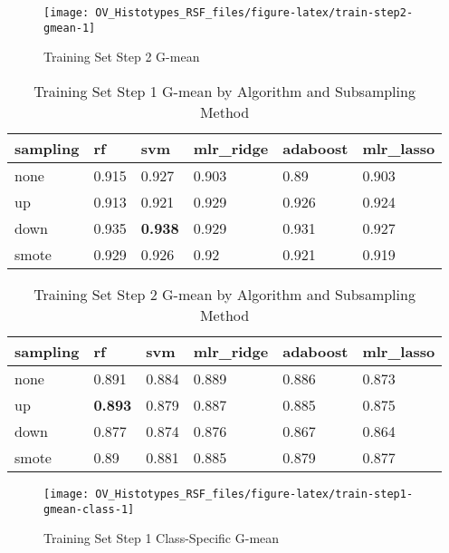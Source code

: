 \documentclass[
]{report}
\begin{document}
\begin{figure}[H]

{\centering \texttt{[image: OV\_Histotypes\_RSF\_files/figure-latex/train-step2-gmean-1]} 

}

\caption{Training Set Step 2 G-mean}\label{fig:train-step2-gmean}
\end{figure}

\begin{table}

\caption{\label{tab:train-step1-gmean-table}Training Set Step 1 G-mean by Algorithm and Subsampling Method}
\centering
\begin{tabular}[t]{l|l|l|l|l|l}
\hline
sampling & rf & svm & mlr\_ridge & adaboost & mlr\_lasso\\
\hline
none & 0.915 & 0.927 & 0.903 & 0.89 & 0.903\\
\hline
up & 0.913 & 0.921 & 0.929 & 0.926 & 0.924\\
\hline
down & 0.935 & \textbf{0.938} & 0.929 & 0.931 & 0.927\\
\hline
smote & 0.929 & 0.926 & 0.92 & 0.921 & 0.919\\
\hline
\end{tabular}
\end{table}

\begin{table}

\caption{\label{tab:train-step2-gmean-table}Training Set Step 2 G-mean by Algorithm and Subsampling Method}
\centering
\begin{tabular}[t]{l|l|l|l|l|l}
\hline
sampling & rf & svm & mlr\_ridge & adaboost & mlr\_lasso\\
\hline
none & 0.891 & 0.884 & 0.889 & 0.886 & 0.873\\
\hline
up & \textbf{0.893} & 0.879 & 0.887 & 0.885 & 0.875\\
\hline
down & 0.877 & 0.874 & 0.876 & 0.867 & 0.864\\
\hline
smote & 0.89 & 0.881 & 0.885 & 0.879 & 0.877\\
\hline
\end{tabular}
\end{table}

\begin{figure}[H]

{\centering \texttt{[image: OV\_Histotypes\_RSF\_files/figure-latex/train-step1-gmean-class-1]} 

}

\caption{Training Set Step 1 Class-Specific G-mean}\label{fig:train-step1-gmean-class}
\end{figure}
\end{document}
